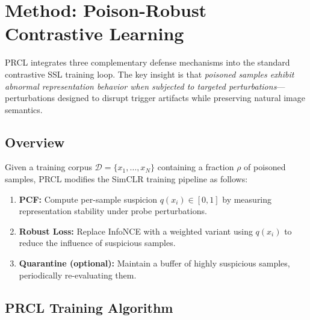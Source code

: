 \documentclass[11pt,a4paper]{article}
\begin{document}
\section{Method: Poison-Robust Contrastive Learning}
\label{sec:method}

PRCL integrates three complementary defense mechanisms into the standard
contrastive SSL training loop.  The key insight is that \emph{poisoned samples
exhibit abnormal representation behavior when subjected to targeted
perturbations}---perturbations designed to disrupt trigger artifacts while
preserving natural image semantics.

\subsection{Overview}

Given a training corpus $\mathcal{D}=\{x_1,\dots,x_N\}$ containing a fraction
$\rho$ of poisoned samples, PRCL modifies the SimCLR training pipeline as
follows:
\begin{enumerate}[nosep]
  \item \textbf{PCF:} Compute per-sample suspicion $q(x_i)\in[0,1]$ by
    measuring representation stability under probe perturbations.
  \item \textbf{Robust Loss:} Replace InfoNCE with a weighted variant using
    $q(x_i)$ to reduce the influence of suspicious samples.
  \item \textbf{Quarantine (optional):} Maintain a buffer of highly suspicious
    samples, periodically re-evaluating them.
\end{enumerate}

\subsection{PRCL Training Algorithm}
\end{document}

